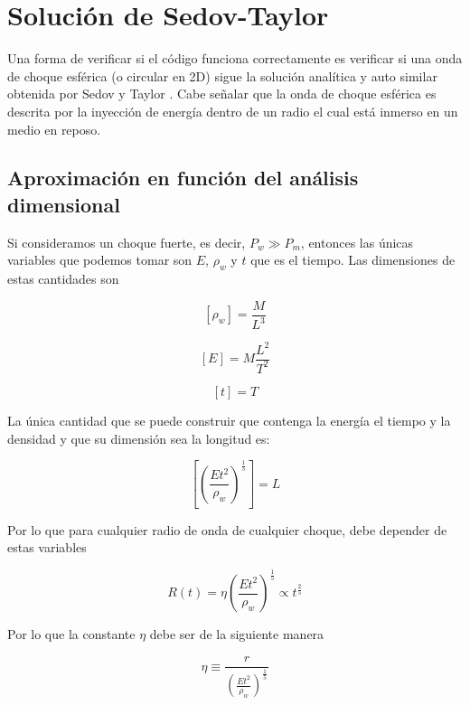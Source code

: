 \documentclass[12pt,a4paper]{book}
\begin{document}
\section{Solución de Sedov-Taylor} \label{seccion_sedov_taylor}

Una forma de verificar si el código funciona correctamente es verificar si una onda de choque esférica (o circular en 2D) sigue la solución  
{\color{blue} analítica y auto similar obtenida por Sedov y Taylor \cite{PAFD}}. 
Cabe señalar que la onda de choque esférica es descrita por la inyección de energía 
dentro de un radio el cual está inmerso en un medio en reposo. 

\subsection{Aproximación en función del análisis dimensional}
Si consideramos un choque fuerte,
es decir, $P_w \gg P_m$,
entonces las únicas variables que podemos tomar son $E$, $\rho_w$ y $t$ que es el tiempo.
Las dimensiones de estas cantidades son 

\begin{equation}
  \left[ \rho_w \right] = \frac{M}{L^3}
\end{equation}

\begin{equation}
  \left[E\right] = M \frac{L^2}{T^2}
\end{equation}

\begin{equation}
  \left[ t\right] = T
\end{equation}

La única cantidad que se puede construir que contenga la energía el tiempo y la densidad y que su dimensión sea
la longitud es:

\begin{equation}
  \left[ \left( \frac{Et^2}{ \rho_w } \right)^{\frac{1}{5}}\right] = L
\end{equation}

Por lo que para cualquier radio de onda de cualquier choque, debe depender de estas variables

\begin{equation}
  R(t) = \eta  \left( \frac{Et^2}{ \rho_w } \right)^{\frac{1}{5}} \varpropto t^{\frac{2}{5}}
\end{equation}

Por lo que la constante $\eta$ debe ser de la siguiente manera

\begin{equation}
  \eta \equiv \frac{r}{\left( \frac{Et^2}{\rho_w} \right)^{\frac{1}{5}}}
\end{equation}
\end{document}
